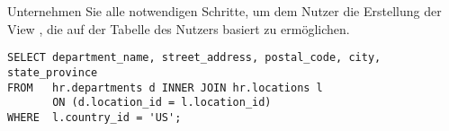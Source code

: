     \item Unternehmen Sie alle notwendigen Schritte, um dem Nutzer  die Erstellung der View , die auf der Tabelle  des Nutzers  basiert zu ermöglichen.
    \begin{lstlisting}[caption={Die View
    \identifier{v\_departments\_in\_usa}},language=oracle_sql,alsolanguage=sqlplus]
SELECT department_name, street_address, postal_code, city, state_province 
FROM   hr.departments d INNER JOIN hr.locations l
       ON (d.location_id = l.location_id)
WHERE  l.country_id = 'US';
    \end{lstlisting}
